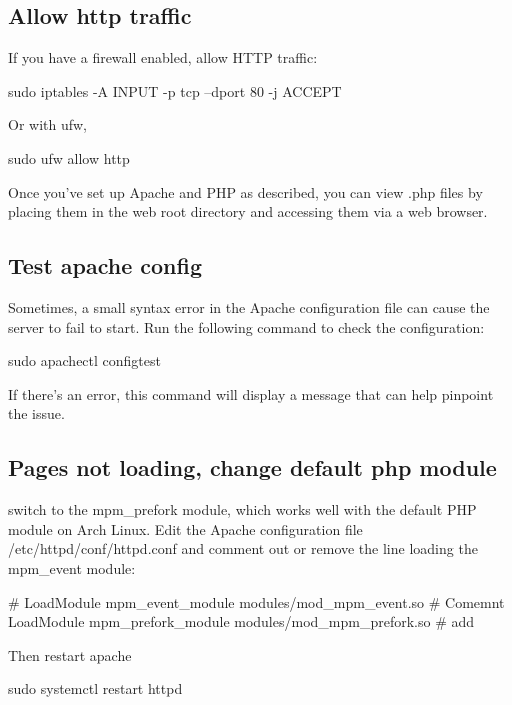 \documentclass{report}
\begin{document}
    \subsection{Allow http traffic}
    \bigbreak \noindent 
    If you have a firewall enabled, allow HTTP traffic:
    \bigbreak \noindent 
    \begin{bashcode}
       sudo iptables -A INPUT -p tcp --dport 80 -j ACCEPT
    \end{bashcode}
    \bigbreak \noindent 
    Or with ufw,
    \begin{bashcode}
    sudo ufw allow http
    \end{bashcode}
    \bigbreak \noindent 
    Once you’ve set up Apache and PHP as described, you can view .php files by placing them in the web root directory and accessing them via a web browser. 
    \bigbreak \noindent 
    \subsection{Test apache config}
    \bigbreak \noindent 
    Sometimes, a small syntax error in the Apache configuration file can cause the server to fail to start. Run the following command to check the configuration:
    \bigbreak \noindent 
    \begin{bashcode}
    sudo apachectl configtest
    \end{bashcode}
    \bigbreak \noindent 
    If there’s an error, this command will display a message that can help pinpoint the issue.

    \bigbreak \noindent 
    \subsection{Pages not loading, change default php module}
    \bigbreak \noindent 
    switch to the mpm\_prefork module, which works well with the default PHP module on Arch Linux.
    \bigbreak \noindent 
    Edit the Apache configuration file /etc/httpd/conf/httpd.conf and comment out or remove the line loading the mpm\_event module:
    \bigbreak \noindent 
    \begin{bashcode}
    # LoadModule mpm_event_module modules/mod_mpm_event.so      # Comemnt
    LoadModule mpm_prefork_module modules/mod_mpm_prefork.so    # add
    \end{bashcode}
    \bigbreak \noindent 
    Then restart apache
    \bigbreak \noindent 
    \begin{bashcode}
    sudo systemctl restart httpd
    \end{bashcode}
\end{document}

